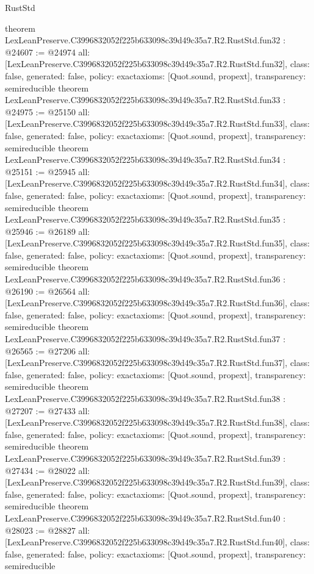 \begin{lexlean}{RustStd}
\begin{coremodule}
{}
theorem LexLeanPreserve.C3996832052f225b633098c39d49c35a7.R2.RustStd.fun32 : @24607 := @24974 {
  all: [LexLeanPreserve.C3996832052f225b633098c39d49c35a7.R2.RustStd.fun32],
  class: false,
  generated: false,
  policy: exact{axioms: [Quot.sound, propext]},
  transparency: semireducible
}
theorem LexLeanPreserve.C3996832052f225b633098c39d49c35a7.R2.RustStd.fun33 : @24975 := @25150 {
  all: [LexLeanPreserve.C3996832052f225b633098c39d49c35a7.R2.RustStd.fun33],
  class: false,
  generated: false,
  policy: exact{axioms: [Quot.sound, propext]},
  transparency: semireducible
}
theorem LexLeanPreserve.C3996832052f225b633098c39d49c35a7.R2.RustStd.fun34 : @25151 := @25945 {
  all: [LexLeanPreserve.C3996832052f225b633098c39d49c35a7.R2.RustStd.fun34],
  class: false,
  generated: false,
  policy: exact{axioms: [Quot.sound, propext]},
  transparency: semireducible
}
theorem LexLeanPreserve.C3996832052f225b633098c39d49c35a7.R2.RustStd.fun35 : @25946 := @26189 {
  all: [LexLeanPreserve.C3996832052f225b633098c39d49c35a7.R2.RustStd.fun35],
  class: false,
  generated: false,
  policy: exact{axioms: [Quot.sound, propext]},
  transparency: semireducible
}
theorem LexLeanPreserve.C3996832052f225b633098c39d49c35a7.R2.RustStd.fun36 : @26190 := @26564 {
  all: [LexLeanPreserve.C3996832052f225b633098c39d49c35a7.R2.RustStd.fun36],
  class: false,
  generated: false,
  policy: exact{axioms: [Quot.sound, propext]},
  transparency: semireducible
}
theorem LexLeanPreserve.C3996832052f225b633098c39d49c35a7.R2.RustStd.fun37 : @26565 := @27206 {
  all: [LexLeanPreserve.C3996832052f225b633098c39d49c35a7.R2.RustStd.fun37],
  class: false,
  generated: false,
  policy: exact{axioms: [Quot.sound, propext]},
  transparency: semireducible
}
theorem LexLeanPreserve.C3996832052f225b633098c39d49c35a7.R2.RustStd.fun38 : @27207 := @27433 {
  all: [LexLeanPreserve.C3996832052f225b633098c39d49c35a7.R2.RustStd.fun38],
  class: false,
  generated: false,
  policy: exact{axioms: [Quot.sound, propext]},
  transparency: semireducible
}
theorem LexLeanPreserve.C3996832052f225b633098c39d49c35a7.R2.RustStd.fun39 : @27434 := @28022 {
  all: [LexLeanPreserve.C3996832052f225b633098c39d49c35a7.R2.RustStd.fun39],
  class: false,
  generated: false,
  policy: exact{axioms: [Quot.sound, propext]},
  transparency: semireducible
}
theorem LexLeanPreserve.C3996832052f225b633098c39d49c35a7.R2.RustStd.fun40 : @28023 := @28827 {
  all: [LexLeanPreserve.C3996832052f225b633098c39d49c35a7.R2.RustStd.fun40],
  class: false,
  generated: false,
  policy: exact{axioms: [Quot.sound, propext]},
  transparency: semireducible
}
\end{coremodule}
\end{lexlean}
